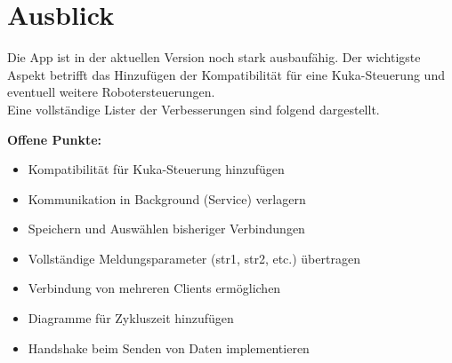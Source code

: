 \chapter{Ausblick}
\label{sec:Ausblick}
Die App ist in der aktuellen Version noch stark ausbaufähig. Der wichtigste 
Aspekt betrifft das Hinzufügen der Kompatibilität für eine Kuka-Steuerung und 
eventuell weitere Robotersteuerungen.\\
Eine vollständige Lister der Verbesserungen sind folgend dargestellt.

\textbf{Offene Punkte:}
\begin{itemize}
\item Kompatibilität für Kuka-Steuerung hinzufügen
\item Kommunikation in Background (Service) verlagern
\item Speichern und Auswählen bisheriger Verbindungen
\item Vollständige Meldungsparameter (str1, str2, etc.) übertragen
\item Verbindung von mehreren Clients ermöglichen
\item Diagramme für Zykluszeit hinzufügen
\item Handshake beim Senden von Daten implementieren
\end{itemize}